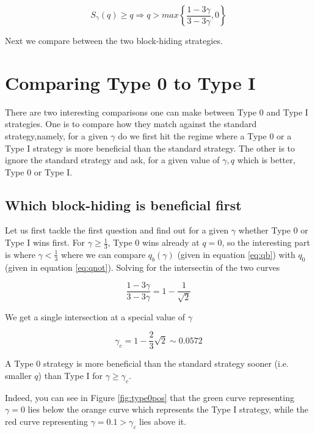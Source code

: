 \documentclass[letterpaper,12pt]{report}
\theoremstyle{plain}
\theoremstyle{definition}
\begin{document}
\begin{equation}\label{eq:0overhonestsummary}
S_{\gamma}(q)\geq q \Longrightarrow
q>max\left\lbrace\dfrac{1-3\gamma}{3-3\gamma},0\right\rbrace
\end{equation}

Next we compare between the two block-hiding strategies.

\section{Comparing Type 0 to Type I}

There are two interesting comparisons one can make between Type 0 and Type I strategies.
One is to compare how they match against the standard strategy,namely, for a given $\gamma$ do we first hit the regime where a Type 0 or a Type I strategy is more beneficial than the standard strategy.
The other is to ignore the standard strategy and ask, for a given value of $\gamma, q$ which is better, Type 0 or Type I.

\subsection{Which block-hiding is beneficial first}
Let us first tackle the first question and find out for a given $\gamma$ whether Type 0 or Type I wins first.
For $\gamma\geq\frac{1}{3}$, Type 0 wins already at $q=0$, so the interesting part is where $\gamma < \frac{1}{3}$ where we can compare $q_b(\gamma)$ (given in equation \ref{eq:qb}) with $q_0$ (given in equation \ref{eq:qnot}). Solving for the intersectin of the two curves

\begin{equation}\label{eq:qbornot}
\dfrac{1-3\gamma}{3-3\gamma}=1-\dfrac{1}{\sqrt{2}}
\end{equation}

We get a single intersection at a special value of $\gamma$

\begin{equation}\label{gamma0before1}
\gamma_c=1-\frac{2}{3}\sqrt{2}\sim 0.0572
\end{equation}

A Type 0 strategy is more beneficial than the standard strategy sooner (i.e. smaller $q$) than Type I for $\gamma \geq\gamma_c$.

Indeed, you can see in Figure \ref{fig:type0pos} that the green curve representing $\gamma=0$ lies below the orange curve which represents the Type I strategy, while the red curve representing $\gamma=0.1>\gamma_c$ lies above it.
\end{document}
